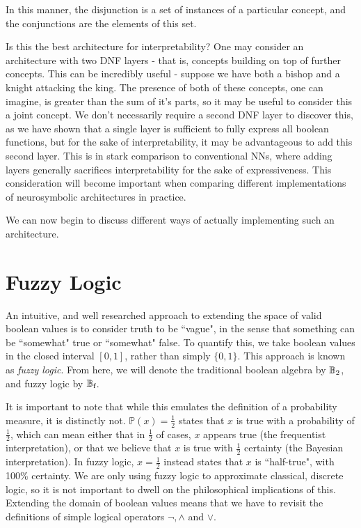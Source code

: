 \documentclass[conference]{report}
\begin{document}
In this manner, the disjunction is a set of instances of a particular concept, and the conjunctions are the elements of this set.

Is this the best architecture for interpretability? One may consider an architecture with two DNF layers - that is, concepts building on top of further concepts. This can be incredibly useful - suppose we have both a bishop and a knight attacking the king. The presence of both of these concepts, one can imagine, is greater than the sum of it's parts, so it may be useful to consider this a joint concept. We don't necessarily require a second DNF layer to discover this, as we have shown that a single layer is sufficient to fully express all boolean functions, but for the sake of interpretability, it may be advantageous to add this second layer. This is in stark comparison to conventional NNs, where adding layers generally sacrifices interpretability for the sake of expressiveness. This consideration will become important when comparing different implementations of neurosymbolic architectures in practice.

We can now begin to discuss different ways of actually implementing such an architecture.

\section{Fuzzy Logic}

\def\Bf{\B_\text{f}}

An intuitive, and well researched approach to extending the space of valid boolean values is to consider truth to be ``vague", in the sense that something can be ``somewhat" true or ``somewhat" false. To quantify this, we take boolean values in the closed interval $[0,1]$, rather than simply $\{0,1\}$. This approach is known as \textit{fuzzy logic}.  From here, we will denote the traditional boolean algebra by $\mathbb{B}_2$, and fuzzy logic by $\Bf$. 

It is important to note that while this emulates the definition of a probability measure, it is distinctly not. $\mathbb{P}(x) = \frac{1}{2}$ states that $x$ is true with a probability of $\frac{1}{2}$, which can mean either that in $\frac{1}{2}$ of cases, $x$ appears true (the frequentist interpretation), or that we believe that $x$ is true with $\frac{1}{2}$ certainty (the Bayesian interpretation). In fuzzy logic, $x = \frac{1}{2}$ instead states that $x$ is ``half-true", with 100\% certainty. We are only using fuzzy logic to approximate classical, discrete logic, so it is not important to dwell on the philosophical implications of this. Extending the domain of boolean values means that we have to revisit the definitions of simple logical operators $\lnot, \land$ and $\lor$.
\end{document}
